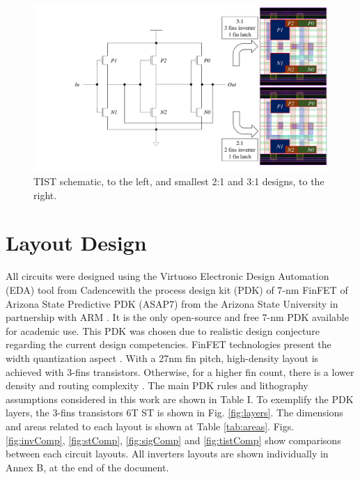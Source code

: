 \documentclass[diss,pgmicro,english]{iiufrgs}
\begin{document}
\begin{figure}[]
\centering
\includegraphics[width=\textwidth, trim={4.5cm 0cm 0cm 0cm},clip]{TISTreis.pdf}
\caption{TIST schematic, to the left, and smallest 2:1 and 3:1 designs, to the right.}
\label{TISTreis}
\end{figure}
\section{Layout Design}

All circuits were designed using the Virtuoso Electronic Design Automation (EDA) tool from Cadence\textregistered with the process design kit (PDK) of 7-nm FinFET of Arizona State Predictive PDK (ASAP7) from the Arizona State University in partnership with ARM \cite{clark2016asap7}. It is the only open-source and free 7-nm PDK available for academic use. This PDK was chosen due to realistic design conjecture regarding the current design competencies. FinFET technologies present the width quantization aspect \cite{2000Simulations}. With a 27nm fin pitch, high-density layout is achieved with 3-fins transistors. Otherwise, for a higher fin count, there is a lower density and routing complexity \cite{chava2015standard}. The main PDK rules and lithography assumptions considered in this work are shown in Table I. To exemplify the PDK layers, the 3-fins transistors 6T ST is shown in Fig. \ref{fig:layers}. The dimensions and areas related to each layout is shown at Table \ref{tab:areas}. Figs. \ref{fig:invComp}, \ref{fig:stComp}, \ref{fig:sigComp} and \ref{fig:tistComp} show comparisons between each circuit layouts. All inverters layouts are shown individually in Annex B, at the end of the document. %
\end{document}
